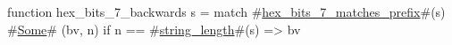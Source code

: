 function hex_bits_7_backwards s =
  match #\hyperref[sailRISCVzhexzybitszy7zymatcheszyprefix]{hex\_bits\_7\_matches\_prefix}#(s) {
      #\hyperref[sailRISCVzSome]{Some}# (bv, n) if n == #\hyperref[sailRISCVzstringzylength]{string\_length}#(s) => bv
  }
